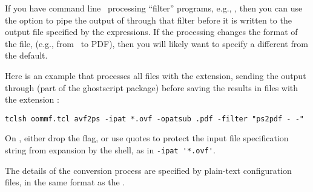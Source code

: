 If you have command line \postscript\ processing ``filter'' programs,
e.g., , then you can
use the  option to pipe the output of  through
that filter before it is written to the output file specified by the
 expressions.  If the processing changes the format of the
file, (e.g., from \postscript\ to PDF), then you will
likely want to specify a  different from the default.

Here is an example that processes all files with the 
extension, sending the output through  (part of the
ghostscript package) before saving the results in files with the
extension :
\begin{verbatim}
tclsh oommf.tcl avf2ps -ipat *.ovf -opatsub .pdf -filter "ps2pdf - -"
\end{verbatim}
On \Unix, either drop the  flag, or use quotes to protect
the input file specification string from expansion by the shell, as in
\verb+-ipat '*.ovf'+.

The details of the conversion process are specified by plain-text
configuration files, in the same format as the
.

